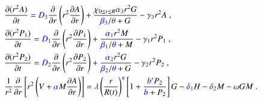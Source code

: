 \documentclass{amsproc}
\theoremstyle{definition}
\theoremstyle{remark}
\numberwithin{equation}{section}
\numberwithin{figure}{section}
\newcommand{\po}[1]{\frac{\partial}{\partial{#1}}}
\newcommand{\pp}[2]{\frac{\partial {#1}}{\partial {#2}}}
\begin{document}
\begin{itemize}
\begin{align*}
    &\pp{(r^2A)}{t} = {\color{blue}D_3}\po{r}\left(r^2\pp{A}{r}\right) + \frac{\chi_{0\le r\le R}{\color{blue}\alpha_3}r^2G}{{\color{blue}\beta_3}/{\color{blue}\theta}+G} - {\color{blue}\gamma_3} r^2A\;,\\
    &\pp{(r^2P_1)}{t} = {\color{blue}D_1}\po{r}\left(r^2\pp{P_1}{r}\right) + \frac{{\color{blue}\alpha_1}r^2M}{{\color{blue}\beta_1}/{\color{blue}\theta}+M} - {\color{blue}\gamma_1} r^2P_1\;,\\
    &\pp{(r^2P_2)}{t} = {\color{blue}D_2}\po{r}\left(r^2\pp{P_2}{r}\right) + \frac{{\color{blue}\alpha_2}r^2G}{{\color{blue}\beta_2}/{\color{blue}\theta}+G} - {\color{blue}\gamma_2} r^2P_2\;,\\
    &\frac{1}{r^2}\po{r}\left[r^2\left(V+{\color{blue}\alpha} M\pp{A}{r}\right)\right] = {\color{blue}\lambda}\left(\frac{r}{R(t)}\right)^{\color{blue}q}\left[1+\frac{{\color{blue}b'}P_2}{{\color{blue}b}+P_2}\right] G - {\color{blue}\delta_1} H - {\color{blue}\delta_2} M - {\color{blue}\omega}GM\;.
  \end{align*}
\end{itemize}
\end{document}

